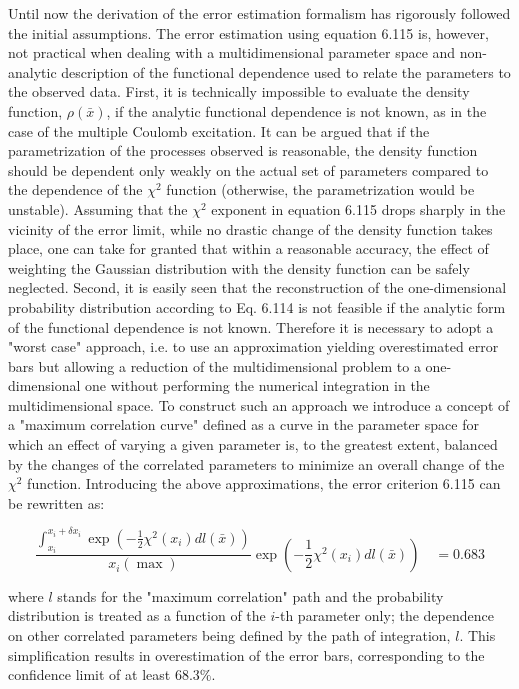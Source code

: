 \documentclass[10pt]{article}
\begin{document}
Until now the derivation of the error estimation formalism has rigorously followed the initial assumptions. The error estimation using equation 6.115 is, however, not practical when dealing with a multidimensional parameter space and non-analytic description of the functional dependence used to relate the parameters to the observed data. First, it is technically impossible to evaluate the density function, $\rho(\bar{x})$, if the analytic functional dependence is not known, as in the case of the multiple Coulomb excitation. It can be argued that if the parametrization of the processes observed is reasonable, the density function should be dependent only weakly on the actual set of parameters compared to the dependence of the $\chi^{2}$ function (otherwise, the parametrization would be unstable). Assuming that the $\chi^{2}$ exponent in equation 6.115 drops sharply in the vicinity of the error limit, while no drastic change of the density function takes place, one can take for granted that within a reasonable accuracy, the effect of weighting the Gaussian distribution with the density function can be safely neglected. Second, it is easily seen that the reconstruction of the one-dimensional probability distribution according to Eq. 6.114 is not feasible if the analytic form of the functional dependence is not known. Therefore it is necessary to adopt a "worst case" approach, i.e. to use an approximation yielding overestimated error bars but allowing a reduction of the multidimensional problem to a one-dimensional one without performing the numerical integration in the multidimensional space. To construct such an approach we introduce a concept of a "maximum correlation curve" defined as a curve in the parameter space for which an effect of varying a given parameter is, to the greatest extent, balanced by the changes of the correlated parameters to minimize an overall change of the $\chi^{2}$ function. Introducing the above approximations, the error criterion 6.115 can be rewritten as:

$$
\frac{\int_{x_{i}}^{x_{i}+\delta x_{i}} \exp \left(-\frac{1}{2} \chi^{2}\left(x_{i}\right) d l(\bar{x})\right)}{x_{i}(\max )} \exp \left(-\frac{1}{2} \chi^{2}\left(x_{i}\right) d l(\bar{x})\right) \quad=0.683
$$

where $l$ stands for the "maximum correlation" path and the probability distribution is treated as a function of the $i$-th parameter only; the dependence on other correlated parameters being defined by the path of integration, $l$. This simplification results in overestimation of the error bars, corresponding to the confidence limit of at least $68.3 \%$.
\end{document}
